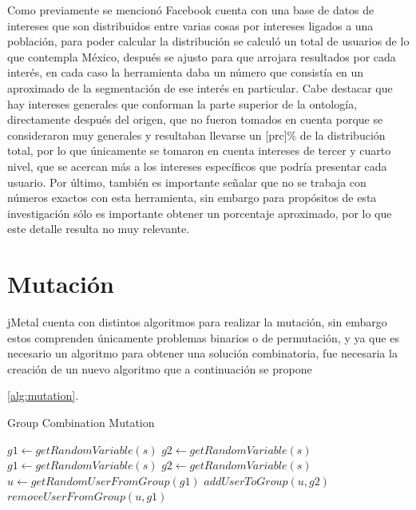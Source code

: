 Como previamente se mencionó Facebook cuenta con una base de datos de intereses que son distribuidos entre varias cosas por intereses ligados a una población, para poder calcular la distribución se calculó un total de usuarios de lo que contempla México, después se ajusto para que arrojara resultados por cada interés, en cada caso la herramienta daba un número que consistía en un aproximado de la segmentación de ese interés en particular. Cabe destacar que hay intereses generales que conforman la parte superior de la ontología, directamente después del origen, que no fueron tomados en cuenta porque se consideraron muy generales y resultaban llevarse un [prc]\% de la distribución total, por lo que únicamente se tomaron en cuenta intereses de tercer y cuarto nivel, que se acercan más a los intereses específicos que podría presentar cada usuario. Por último, también es importante señalar que no se trabaja con números exactos con esta herramienta, sin embargo para propósitos de esta investigación sólo es importante obtener un porcentaje aproximado, por lo que este detalle resulta no muy relevante.


\section{Mutación}

jMetal cuenta con distintos algoritmos para realizar la mutación, sin embargo estos comprenden únicamente problemas binarios o de permutación, y ya que es necesario un algoritmo para obtener una solución combinatoria, fue necesaria la creación de un nuevo algoritmo que a continuación se propone

\ref{alg:mutation}.
\begin{algorithm}
\caption{Group Combination Mutation}\label{alg:mutation}
\begin{algorithmic}[1]
\State $g1\gets getRandomVariable(s)$
\State $g2\gets getRandomVariable(s)$
\State $g1 \gets getRandomVariable(s)$
\EndWhile\label{euclidendwhile}
\State $g2 \gets getRandomVariable(s)$
\EndWhile\label{euclidendwhile}
\State $u \gets getRandomUserFromGroup(g1)$ 
\State $addUserToGroup(u,g2)$
\State $removeUserFromGroup(u,g1)$
\EndProcedure
\end{algorithmic}
\end{algorithm}

